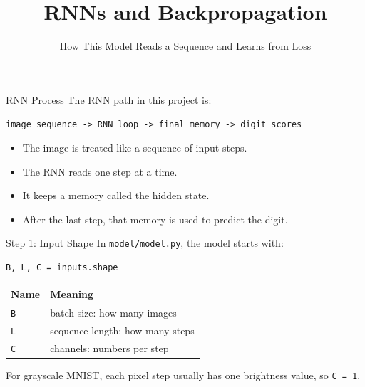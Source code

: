 \documentclass{beamer}
\title{RNNs and Backpropagation}
\subtitle{How This Model Reads a Sequence and Learns from Loss}
\author{}
\date{}
\begin{document}
\frame{\titlepage}

\begin{frame}{RNN Process}
\small
The RNN path in this project is:

\vspace{0.2cm}

\begin{center}
\texttt{image sequence -> RNN loop -> final memory -> digit scores}
\end{center}

\vspace{0.25cm}

\begin{itemize}
    \item The image is treated like a sequence of input steps.
    \item The RNN reads one step at a time.
    \item It keeps a memory called the hidden state.
    \item After the last step, that memory is used to predict the digit.
\end{itemize}
\end{frame}

\begin{frame}[fragile]{Step 1: Input Shape}
\small
In \texttt{model/model.py}, the model starts with:

\vspace{0.15cm}

\begin{verbatim}
B, L, C = inputs.shape
\end{verbatim}

\vspace{0.2cm}

\begin{center}
\begin{tabular}{l l}
\toprule
Name & Meaning \\
\midrule
\texttt{B} & batch size: how many images \\
\texttt{L} & sequence length: how many steps \\
\texttt{C} & channels: numbers per step \\
\bottomrule
\end{tabular}
\end{center}

For grayscale MNIST, each pixel step usually has one brightness value, so \texttt{C = 1}.
\end{frame}
\end{document}
